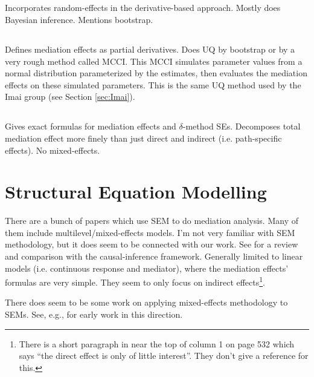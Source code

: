 \documentclass{report}
\begin{document}
\subsection{\citet{Mar24}}

Incorporates random-effects in the derivative-based approach. Mostly does Bayesian inference. Mentions bootstrap.

\subsection{\citet{Gel18}}

Defines mediation effects as partial derivatives. Does UQ by bootstrap or by a very rough method called MCCI. This MCCI simulates parameter values from a normal distribution parameterized by the estimates, then evaluates the mediation effects on these simulated parameters. This is the same UQ method used by the Imai group (see Section \ref{sec:Imai}).


\subsection{\citet{Dor22}}

Gives exact formulas for mediation effects and $\delta$-method SEs. Decomposes total mediation effect more finely than just direct and indirect (i.e. path-specific effects). No mixed-effects.

\section{Structural Equation Modelling}
\label{sec:SEM}

There are a bunch of papers which use SEM to do mediation analysis. Many of them include multilevel/mixed-effects models. I'm not very familiar with SEM methodology, but it does seem to be connected with our work. See \citet{Val13} for a review and comparison with the causal-inference framework. Generally limited to linear models (i.e. continuous response and mediator), where the mediation effects' formulas are very simple. They seem to only focus on indirect effects\footnote{There is a short paragraph in \citet{Zit21} near the top of column 1 on page 532 which says ``the direct effect is only of little interest''. They don't give a reference for this.}.

There does seem to be some work on applying mixed-effects methodology to SEMs. See, e.g., \citet{Rab04} for early work in this direction.
\end{document}
